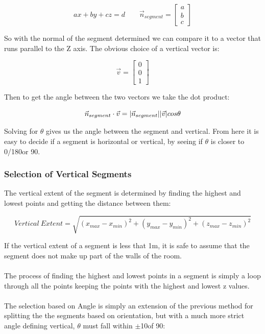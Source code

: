 			\begin{equation}
			ax + by + cz = d  \quad\quad
			\vec{n}_{segment} = \begin{bmatrix}a\\b\\c\end{bmatrix}
			\end{equation}
			
			So with the normal of the segment determined we can compare it to a vector that runs parallel to the Z axis. The obvious choice of a vertical vector is:
			
			\begin{equation}
			\vec{v} = \begin{bmatrix}0\\0\\1\end{bmatrix}
			\end{equation}
			
			Then to get the angle between the two vectors we take the dot product:
			
			\begin{equation}
			\vec{n}_{segment}\cdot \vec{v} = \lvert \vec{n}_{segment} \rvert \lvert \vec{v} \rvert cos \theta
			\end{equation}
			
			Solving for $\theta$ gives us the angle between the segment and vertical. From here it is easy to decide if a segment is horizontal or vertical, by seeing if $\theta$ is closer to 0\textdegree/180\textdegree or 90\textdegree.
			
		\subsubsection{Selection of Vertical Segments}
			
			The vertical extent of the segment is determined by finding the highest and lowest points and getting the distance between them:
			
			\begin{equation}
			Vertical \: Extent = \sqrt{(x_{max} - x_{min})^2+(y_{max} - y_{min})^2+(z_{max} - z_{min})^2}
			\end{equation}
			
			If the vertical extent of a segment is less that 1m, it is safe to assume that the segment does not make up part of the walls of the room.\\
			\\
			The process of finding the highest and lowest points in a segment is simply a loop through all the points keeping the points with the highest and lowest z values.\\
			\\
			The selection based on Angle is simply an extension of the previous method for splitting the the segments based on orientation, but with a much more strict angle defining vertical, $\theta$ must fall within $\pm$10\textdegree of 90\textdegree:
			
